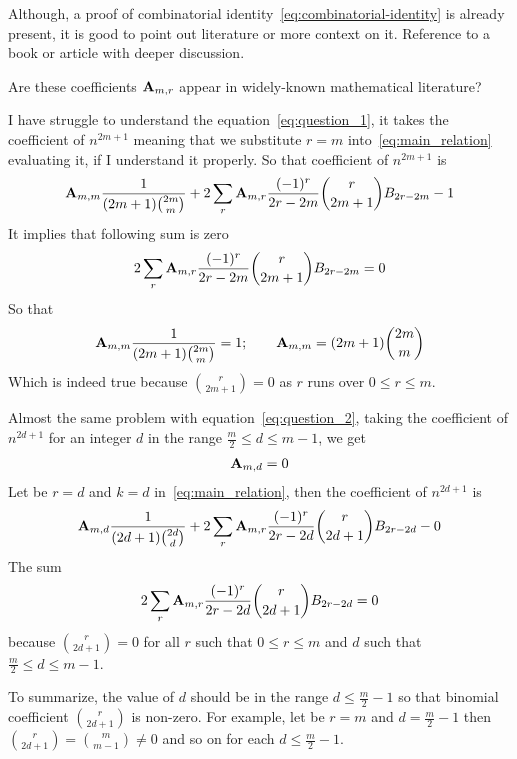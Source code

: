 \begin{question}
    Although, a proof of combinatorial identity~\eqref{eq:combinatorial-identity} is already present, it is good
    to point out literature or more context on it.
    Reference to a book or article with deeper discussion.
\end{question}
\begin{question}
    Are these coefficients ${\mathbf{A}} \sb{m,r}$ appear in widely-known mathematical literature?
\end{question}
\begin{question}
    I have struggle to understand the equation~\eqref{eq:question_1}, it takes the coefficient of $n^{2m+1}$ meaning that
    we substitute $r=m$ into~\eqref{eq:main_relation} evaluating it, if I understand it properly.
    So that coefficient of $n^{2m+1}$ is
    \begin{align*}
        {\mathbf{A}} \sb{m,m} \frac{1}{(2m+1) \binom{2m}{m}} + 2 \sum_{r} {\mathbf{A}} \sb{m,r} \frac{(-1)^r}{2r-2m} \binom{r}{2m+1} {B}\sb{2r-2m} - 1
    \end{align*}
    It implies that following sum is zero
    \begin{align*}
        2 \sum_{r} {\mathbf{A}} \sb{m,r} \frac{(-1)^r}{2r-2m} \binom{r}{2m+1} {B}\sb{2r-2m} = 0
    \end{align*}
    So that
    \begin{align*}
        {\mathbf{A}} \sb{m,m} \frac{1}{(2m+1) \binom{2m}m} = 1; \quad \quad {\mathbf{A}} \sb{m,m} = (2m+1)\binom{2m}{m}
    \end{align*}
    Which is indeed true because $\binom{r}{2m+1} = 0$ as $r$ runs over $0 \leq r \leq m$.
\end{question}
\begin{question}
    Almost the same problem with equation~\eqref{eq:question_2},
    taking the coefficient of $n^{2d+1}$ for an integer $d$ in the range $\frac{m}{2} \leq d \leq m-1$, we get
    \begin{align*}
        {\mathbf{A}} \sb{m,d} = 0
    \end{align*}
    Let be $r=d$ and $k=d$ in~\eqref{eq:main_relation}, then the coefficient of $n^{2d+1}$ is
    \begin{align*}
        {\mathbf{A}} \sb{m,d} \frac{1}{(2d+1) \binom{2d}{d}} + 2 \sum_{r} {\mathbf{A}} \sb{m,r} \frac{(-1)^r}{2r-2d} \binom{r}{2d+1} {B}\sb{2r-2d} - 0
    \end{align*}
    The sum
    \begin{align*}
        2 \sum_{r} {\mathbf{A}} \sb{m,r} \frac{(-1)^r}{2r-2d} \binom{r}{2d+1} {B}\sb{2r-2d} = 0
    \end{align*}
    because $\binom{r}{2d+1}=0$ for all $r$ such that $0 \leq r \leq m$ and $d$ such that $\frac{m}{2} \leq d \leq m-1$.
\end{question}
To summarize, the value of $d$ should be in the range $d \leq \frac{m}{2}-1$ so that binomial coefficient $\binom{r}{2d+1}$
is non-zero.
For example, let be $r=m$ and $d=\frac{m}{2}-1$ then $\binom{r}{2d+1} = \binom{m}{m-1} \neq 0$ and so on for each $d \leq \frac{m}{2}-1$.
